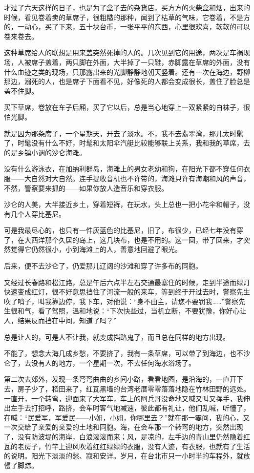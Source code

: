 \par 才过了六天这样的日子，也是为了盒子去的杂货店，买方方的火柴盒和烟，出来的时候，看见卷着卖的草席子，很粗糙的那种，闻到了枯草的气味，它卷着，不是方的，一动心，买了下来，五十块台币，一张平平的东西，心里很欢喜，软软的可以卷来卷去。
\par 这种草席给人的联想是用来盖突然死掉的人的。几次见到它的用途，两次是车祸现场，人被席子盖着，两只脚在外面，大半掉了一只鞋，赤脚露在草席的外面，没有什么血迹之类的现场，只那露出来的光脚静静地朝天竖着。还有一次在海边，野柳那边，溺死的人，也是席子下面看不见，好像死的人都会变成很长，盖住了脸总是盖不住脚。
\par 买下草席，卷放在车子后厢，买了它以后，总是当心地穿上一双紧紧的白袜子，很怕光脚。
\par 就是因为那条席子，一个星期天，开去了淡水。不，我不去翡翠湾，那儿太时髦了，时髦没有什么不好，时髦和太阳伞汽艇比较能够联上关系，我和我的草席，去的是乡镇小调的沙仑海滩。
\par 没有什么游泳衣，在加纳利群岛，海滩上的男女老幼和狗，在阳光下都不穿任何衣服——大自然对大自然。连手提收音机也不许带的，海滩只许有海潮和风的声音，不然，警察要来抓的——如果你放人造音乐和穿衣服。
\par 沙仑的人美，大半接近乡土，穿着短裤，在玩水，头上总也一把小花伞和帽子，没有几个人穿比基尼。
\par 可是我最尽心的，也只有一件灰蓝色的比基尼，旧了，布很少，已经七年没有穿了，在大西洋那个久居的岛上，这几块布，也是不用的。这一回，带了回来，才突然觉得它仍然很小，小到海滩上的人，善意地回避了眼光。
\par 后来，便不去沙仑了，仍爱那儿辽阔的沙滩和穿了许多布的同胞。
\par 又经过长春路和松江路，总是午后六点半左右交通最塞住的时候，走到半途而绿灯快速变成红灯，很不好意思挡住了河流一般的来车，等到终于开过去时，警察先生吹了哨子，叫我靠边停，我下车，对他说：“身不由主，请您不要罚我……”警察先生很和气，看了驾照，温和地说：“下次快些过，当机立断，不要犹豫，你好心让人，结果反而挡在中间，知道了吗？”
\par 总是让人的，可是人不让我，就变成挡路鬼了，而且总在同样的地方出现。
\par 不能了，想念大海几成乡愁，不要挤了，我有一条草席，可以带了到海边，也不沙仑了，去没有人的地方，一个星期一次，不去任何海水浴场了。
\par 第二次去郊外，发现一条弯弯曲曲的乡间小路，看看地图，是沿海的，一直开下去，房子少了，稻田来了，红瓦黑墙的台湾老厝零零落落地隐在竹林田野的远处。一直开，一个转弯，迎面来了大军车，车上的阿兵哥没命地又喊又叫又挥手，我伸出左手去打招呼，路挤，会车时客气地减速，彼此都有礼让，他们乱喊，听懂了，在喊：“民爱军，军爱民——小姐，小姐，你哪里去？”就在那一霎间，我的心，又一次交给了亲爱的亲爱的土地和同胞。海，在会车那一个转弯的地方，突然出现了，没有防波堤的海岸，白浪滚滚而来；风，是凉的，左手边的青山里仍然隐着红瓦的老房子，竹竿上迎风吹着红红绿绿的衣服，没有人迹，有衣服，也就有了生活的说明。阳光下淡淡的愁、寂和安详。岁月，在台北市只一小时半的车程外，就放慢了脚踪。
